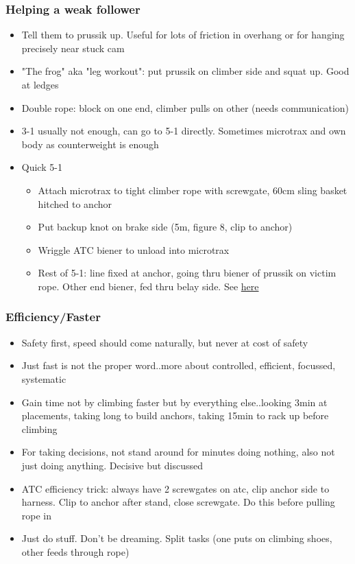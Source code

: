 \subsubsection{Helping a weak follower}
\begin{itemize}
\item Tell them to prussik up. Useful for lots of friction in overhang or for hanging precisely near stuck cam
\item "The frog" aka "leg workout": put prussik on climber side and squat up. Good at ledges
\item Double rope: block on one end, climber pulls on other (needs communication)
\item 3-1 usually not enough, can go to 5-1 directly. Sometimes microtrax and own body as counterweight is enough
\item Quick 5-1
	\begin{itemize}
	\item Attach microtrax to tight climber rope with screwgate, 60cm sling basket hitched to anchor
	\item Put backup knot on brake side (5m, figure 8, clip to anchor)
	\item Wriggle ATC biener to unload into microtrax
	\item Rest of 5-1: line fixed at anchor, going thru biener of prussik on victim rope. Other end biener, fed thru belay side. See \href{https://www.alpinesavvy.com/blog/6-1-compound-pulleys-in-the-real-world}{here}
	\end{itemize}
\end{itemize}


\subsubsection{Efficiency/Faster}
\begin{itemize}
\item Safety first, speed should come naturally, but never at cost of safety
\item Just fast is not the proper word..more about controlled, efficient, focussed, systematic
\item Gain time not by climbing faster but by everything else..looking 3min at placements, taking long to build anchors, taking 15min to rack up before climbing
\item For taking decisions, not stand around for minutes doing nothing, also not just doing anything. Decisive but discussed
\item ATC efficiency trick: always have 2 screwgates on atc, clip anchor side to harness. Clip to anchor after stand, close screwgate. Do this before pulling rope in
\item Just do stuff. Don't be dreaming. Split tasks (one puts on climbing shoes, other feeds through rope)
\end{itemize} 

